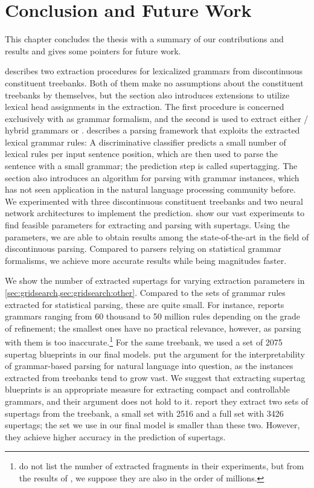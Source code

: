 \documentclass[../document.tex]{subfiles}
\begin{document}
    \chapter{Conclusion and Future Work}
    This chapter concludes the thesis with a summary of our contributions and results and gives some pointers for future work.

     describes two extraction procedures for lexicalized grammars from discontinuous constituent treebanks.
    Both of them make no assumptions about the constituent treebanks by themselves, but the section also introduces extensions to utilize lexical head assignments in the extraction.
    The first procedure is concerned exclusively with  as grammar formalism, and the second is used to extract either / hybrid grammars or .
     describes a parsing framework that exploits the extracted lexical grammar rules:
        A discriminative classifier predicts a small number of lexical rules per input sentence position, which are then used to parse the sentence with a small grammar; the prediction step is called supertagging.
    The section also introduces an algorithm for parsing with  grammar instances, which has not seen application in the natural language processing community before.
    We experimented with three discontinuous constituent treebanks and two neural network architectures to implement the prediction.
     show our vast experiments to find feasible parameters for extracting and parsing with supertags.
    Using the parameters, we are able to obtain results among the state-of-the-art in the field of discontinuous parsing.
    Compared to parsers relying on statistical grammar formalisms, we achieve more accurate results while being magnitudes faster.
    
    We show the number of extracted supertags for varying extraction parameters in \cref{sec:gridsearch,sec:gridsearch:other}.
    Compared to the sets of grammar rules extracted for statistical parsing, these are quite small.
    For instance, \citet[cf.\@ Figure 7.4]{Geb20} reports grammars ranging from 60 thousand to 50 million rules depending on the grade of refinement; the smallest ones have no practical relevance, however, as parsing with them is too inaccurate.\footnote{
        \citet{CraSchBod16} do not list the number of extracted fragments in their experiments, but from the results of \citet{San11}, we suppose they are also in the order of millions.
    }
    For the same treebank, we used a set of 2075 supertag blueprints in our final models.
    \citet{Geb20} put the argument for the interpretability of grammar-based parsing for natural language into question, as the instances extracted from treebanks tend to grow vast.
    We suggest that extracting supertag blueprints is an appropriate measure for extracting compact and controllable grammars, and their argument does not hold to it.
    \citet[][in Table 1]{Bla18} report they extract two sets of  supertags from the treebank, a small set with 2516 and a full set with 3426 supertags; the set we use in our final model is smaller than these two.
    However, they achieve higher accuracy in the prediction of supertags.
\end{document}
